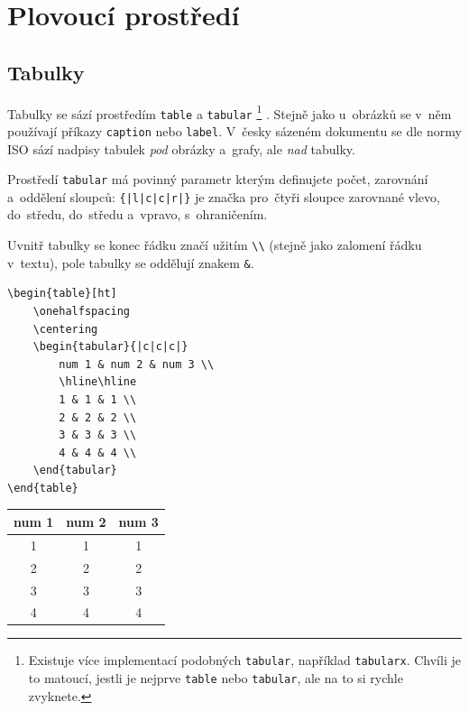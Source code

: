 \clearpage
\section{Plovoucí prostředí}

\subsection{Tabulky}

Tabulky se sází prostředím \texttt{table} a \texttt{tabular}%
\footnote{
    Existuje více implementací podobných \texttt{tabular}, například \texttt{tabularx}.
    Chvíli je to matoucí, jestli je nejprve \texttt{table} nebo \texttt{tabular}, ale na to si rychle zvyknete.
}%
.
Stejně jako u~obrázků se v~něm používají příkazy \texttt{caption} nebo \texttt{label}.
V~česky sázeném dokumentu se dle normy ISO sází nadpisy tabulek \emph{pod} obrázky a~grafy, ale \emph{nad} tabulky.

Prostředí \texttt{tabular} má povinný parametr kterým definujete počet, zarovnání a~oddělení sloupců: \verb_{|l|c|c|r|}_ je značka pro~čtyři sloupce zarovnané vlevo, do~středu, do~středu a~vpravo, s~ohraničením.

Uvnitř tabulky se konec řádku značí užitím \verb|\\| (stejně jako zalomení řádku v~textu), pole tabulky se oddělují znakem \verb|&|.

\begin{mdframed}
\begin{verbatim}
\begin{table}[ht]
    \onehalfspacing
    \centering
    \begin{tabular}{|c|c|c|}
        num 1 & num 2 & num 3 \\
        \hline\hline
        1 & 1 & 1 \\
        2 & 2 & 2 \\
        3 & 3 & 3 \\
        4 & 4 & 4 \\ 
    \end{tabular}
\end{table}
\end{verbatim}
    \label{tbl:dvanact_hodnot}
    \begin{tabular}{|c|c|c|}
        num 1 & num 2 & num 3 \\
        \hline\hline
        1 & 1 & 1 \\
        2 & 2 & 2 \\
        3 & 3 & 3 \\
        4 & 4 & 4 \\ 
    \end{tabular}
\end{mdframed}
\FloatBarrier

